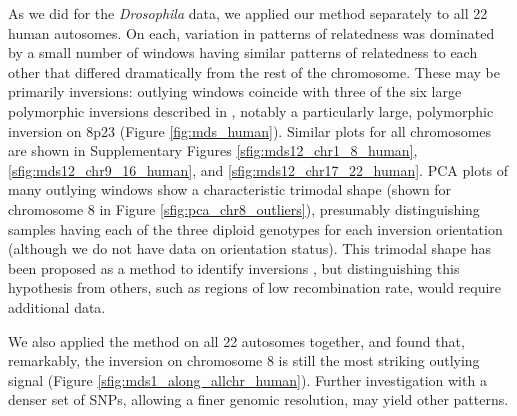 \documentclass[11pt, oneside]{article}   	%
\begin{document}
As we did for the \textit{Drosophila} data, we applied our method separately to all 22 human autosomes.
On each, variation in patterns of relatedness was dominated by a small number of windows
having similar patterns of relatedness to each other that differed dramatically from the rest of the chromosome.
These may be primarily inversions: outlying windows coincide with
three of the six large polymorphic inversions described in \citet{antonacci2009characterization},
notably a particularly large, polymorphic inversion on 8p23 (Figure \ref{fig:mds_human}). 
Similar plots for all chromosomes are shown
in Supplementary Figures \ref{sfig:mds12_chr1_8_human}, \ref{sfig:mds12_chr9_16_human}, and \ref{sfig:mds12_chr17_22_human}.
PCA plots of many outlying windows show a characteristic trimodal shape 
(shown for chromosome 8 in Figure \ref{sfig:pca_chr8_outliers}),
presumably distinguishing samples having each of the three diploid genotypes for each inversion orientation
(although we do not have data on orientation status).
This trimodal shape has been proposed as a method to identify inversions \citep{ma2012investigation},
but distinguishing this hypothesis from others,
such as regions of low recombination rate,
would require additional data.

We also applied the method on all 22 autosomes together, 
and found that, remarkably, 
the inversion on chromosome 8 is still the most striking outlying signal (Figure \ref{sfig:mds1_along_allchr_human}). 
Further investigation with a denser set of SNPs,
allowing a finer genomic resolution,
may yield other patterns.
\end{document}
